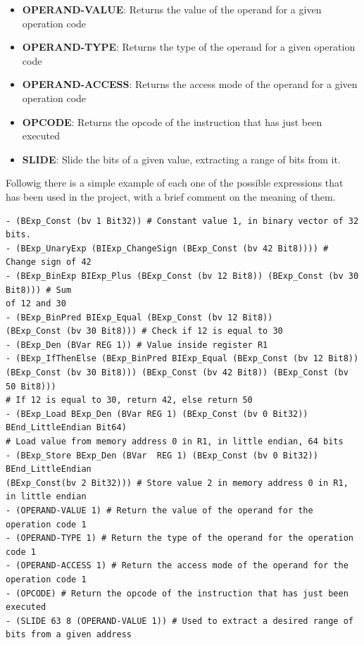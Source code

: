 \begin{itemize}
  \item \textbf{OPERAND-VALUE}: Returns the value of the operand for a given operation
    code

  \item \textbf{OPERAND-TYPE}: Returns the type of the operand for a given operation
    code

  \item \textbf{OPERAND-ACCESS}: Returns the access mode of the operand for a given
    operation code

  \item \textbf{OPCODE}: Returns the opcode of the instruction that has just been
    executed

  \item \textbf{SLIDE}: Slide the bits of a given value, extracting a range of
    bits from it.
\end{itemize}

Followig there is a simple example of each one of the possible expressions that
has been used in the project, with a brief comment on the meaning of them.
\begin{verbatim}
- (BExp_Const (bv 1 Bit32)) # Constant value 1, in binary vector of 32 bits.
- (BExp_UnaryExp (BIExp_ChangeSign (BExp_Const (bv 42 Bit8)))) # Change sign of 42
- (BExp_BinExp BIExp_Plus (BExp_Const (bv 12 Bit8)) (BExp_Const (bv 30 Bit8))) # Sum
of 12 and 30
- (BExp_BinPred BIExp_Equal (BExp_Const (bv 12 Bit8)) 
(BExp_Const (bv 30 Bit8))) # Check if 12 is equal to 30
- (BExp_Den (BVar REG 1)) # Value inside register R1
- (BExp_IfThenElse (BExp_BinPred BIExp_Equal (BExp_Const (bv 12 Bit8)) 
(BExp_Const (bv 30 Bit8))) (BExp_Const (bv 42 Bit8)) (BExp_Const (bv 50 Bit8))) 
# If 12 is equal to 30, return 42, else return 50
- (BExp_Load BExp_Den (BVar REG 1) (BExp_Const (bv 0 Bit32)) BEnd_LittleEndian Bit64) 
# Load value from memory address 0 in R1, in little endian, 64 bits
- (BExp_Store BExp_Den (BVar  REG 1) (BExp_Const (bv 0 Bit32)) BEnd_LittleEndian 
(BExp_Const(bv 2 Bit32))) # Store value 2 in memory address 0 in R1, in little endian
- (OPERAND-VALUE 1) # Return the value of the operand for the operation code 1
- (OPERAND-TYPE 1) # Return the type of the operand for the operation code 1
- (OPERAND-ACCESS 1) # Return the access mode of the operand for the operation code 1
- (OPCODE) # Return the opcode of the instruction that has just been executed
- (SLIDE 63 8 (OPERAND-VALUE 1)) # Used to extract a desired range of bits from a given address
\end{verbatim}


